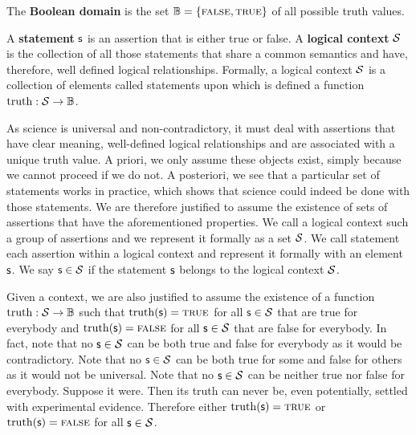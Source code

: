 \documentclass[11pt,letterpaper,fleqn]{memoir} %
\begin{document}
\begin{mathSection}
\begin{defn}
	The \textbf{Boolean domain} is the set $\mathbb{B} = \{\textsc{false}, \textsc{true}\}$ of all possible truth values.
\end{defn}


\begin{axiom}\label{ax_statement}
	A \textbf{statement} $\mathsf{s}$ is an assertion that is either true or false. A \textbf{logical context} $\mathcal{S}$ is the collection of all those statements that share a common semantics and have, therefore, well defined logical relationships. Formally, a logical context $\mathcal{S}$ is a collection of elements called statements upon which is defined a function $\operatorname{truth}: \mathcal{S} \to \mathbb{B}$.
\end{axiom}

\begin{justification}
	As science is universal and non-contradictory, it must deal with assertions that have clear meaning, well-defined logical relationships and are associated with a unique truth value. A priori, we only assume these objects exist, simply because we cannot proceed if we do not. A posteriori, we see that a particular set of statements works in practice, which shows that science could indeed be done with those statements. We are therefore justified to assume the existence of sets of assertions that have the aforementioned properties. We call a logical context such a group of assertions and we represent it formally as a set $\mathcal{S}$. We call statement each assertion within a logical context and represent it formally with an element $\mathsf{s}$. We say $\mathsf{s} \in \mathcal{S}$ if the statement $\mathsf{s}$ belongs to the logical context $\mathcal{S}$.
	
	Given a context, we are also justified to assume the existence of a function $\operatorname{truth} : \mathcal{S} \to \mathbb{B}$ such that $\operatorname{truth}(\mathsf{s}) = \textsc{true}$ for all $\mathsf{s} \in \mathcal{S}$ that are true for everybody and $\operatorname{truth}(\mathsf{s}) = \textsc{false}$ for all $\mathsf{s} \in \mathcal{S}$ that are false for everybody. In fact, note that no $\mathsf{s} \in \mathcal{S}$ can be both true and false for everybody as it would be contradictory. Note that no $\mathsf{s} \in \mathcal{S}$ can be both true for some and false for others as it would not be universal. Note that no $\mathsf{s} \in \mathcal{S}$ can be neither true nor false for everybody. Suppose it were. Then its truth can never be, even potentially, settled with experimental evidence. Therefore either $\operatorname{truth}(\mathsf{s}) = \textsc{true}$ or $\operatorname{truth}(\mathsf{s}) = \textsc{false}$ for all $\mathsf{s} \in \mathcal{S}$.


\end{justification}
\end{mathSection}
\end{document}
